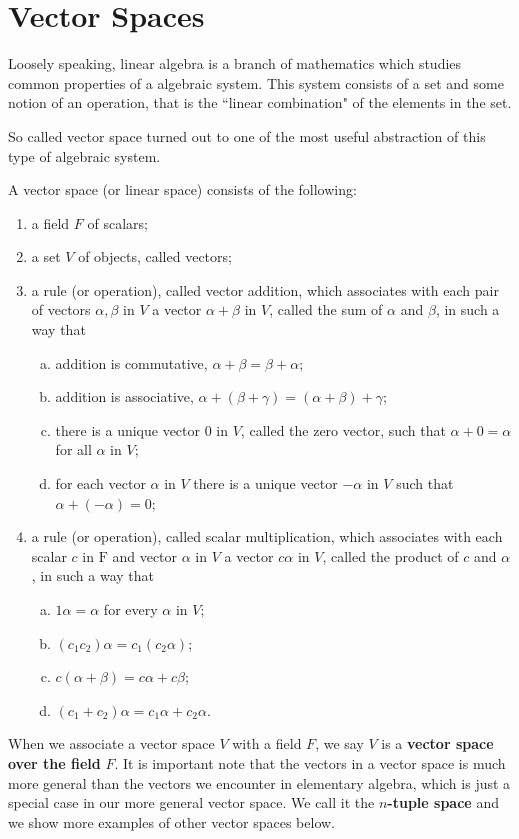 \documentclass[main.tex]{subfiles}
\begin{document}
\section{Vector Spaces}

Loosely speaking, linear algebra is a branch of mathematics which studies common properties of a algebraic system. This system consists of a set and some notion of an operation, that is the ``linear combination" of the elements in the set. 

So called vector space turned out to one of the most useful abstraction of this type of algebraic system. 
\begin{definition}
    A vector space (or linear space) consists of the following:
    \begin{enumerate}
        \item a field $F$ of scalars;
        \item a set $V$ of objects, called vectors;
        \item a rule (or operation), called vector addition, which associates with each pair of vectors $\alpha, \beta$ in $V$ a vector $\alpha+\beta$ in $V$, called the sum of $\alpha$ and $\beta$, in such a way that
        \begin{enumerate}[a.]
            \item addition is commutative, $\alpha+\beta=\beta+\alpha$;
            \item addition is associative, $\alpha+(\beta+\gamma)=(\alpha+\beta)+\gamma$;
            \item there is a unique vector 0 in $V$, called the zero vector, such that $\alpha+0=\alpha$ for all $\alpha$ in $V$;
            \item for each vector $\alpha$ in $V$ there is a unique vector $-\alpha$ in $V$ such that $\alpha+(-\alpha)=0$;
        \end{enumerate}
        \item a rule (or operation), called scalar multiplication, which associates with each scalar $c$ in $\mathrm{F}$ and vector $\alpha$ in $V$ a vector $c \alpha$ in $V$, called the product of $c$ and $\alpha$, in such a way that
        \begin{enumerate}[a.]
            \item $1 \alpha=\alpha$ for every $\alpha$ in $V$;
            \item $\left(c_1 c_2\right) \alpha=c_1\left(c_2 \alpha\right)$;
            \item $c(\alpha+\beta)=c \alpha+c \beta$;
            \item $\left(c_1+c_2\right) \alpha=c_1 \alpha+c_2 \alpha$.
        \end{enumerate}
    \end{enumerate}
\end{definition}
When we associate a vector space $V$ with a field $F$, we say $V$ is a \textbf{vector space over the field} $F$. It is important note that the vectors in a vector space is much more general than the vectors we encounter in elementary algebra, which is just a special case in our more general vector space. We call it the \textbf{$n$-tuple space} and we show more examples of other vector spaces below. 
\end{document}
